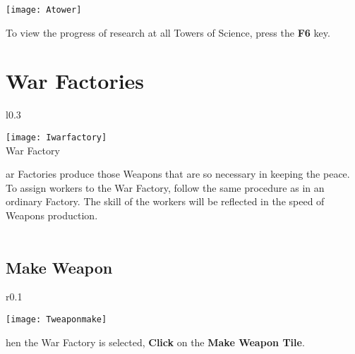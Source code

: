 \begin{center}
	\texttt{[image: Atower]} %
\end{center}


To view the progress of research at all Towers of Science, press the \textbf{F6} key.

\section{War Factories}


\begin{wrapfigure}{l}{0.3\textwidth}
	\vspace{-20pt}
	\begin{center}
		\texttt{[image: Iwarfactory]} %
		\\ War Factory
	\end{center}
	\vspace{-30pt}
\end{wrapfigure}

ar Factories produce those Weapons that are so necessary in keeping the peace. To assign workers to the War Factory, follow the same procedure as in an ordinary Factory. The skill of the workers will be reflected in the speed of Weapons production. \\ \\ %

\subsection{Make Weapon}


\begin{wrapfigure}{r}{0.1\textwidth}
	\vspace{-20pt}
	\begin{center}
		\texttt{[image: Tweaponmake]}
	\end{center}
	\vspace{-20pt}
\end{wrapfigure}

hen the War Factory is selected, \textbf{Click} on the \textbf{Make Weapon Tile}.


